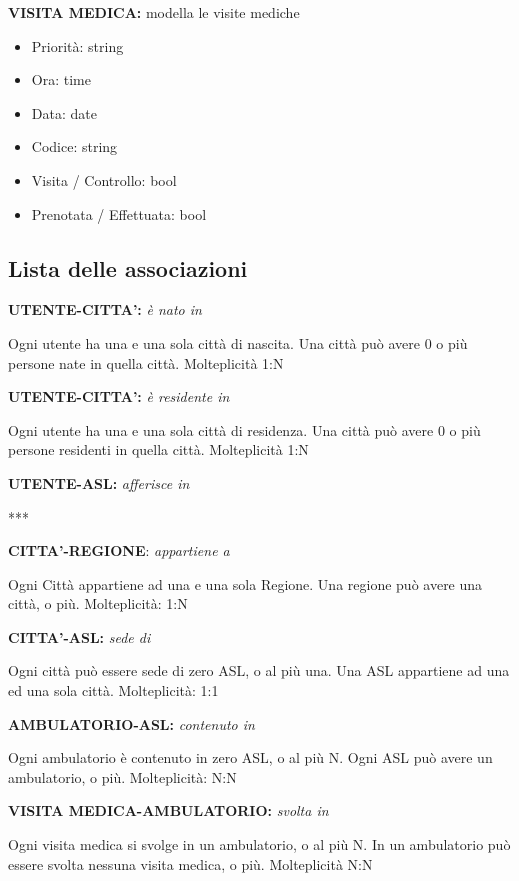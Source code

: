 \documentclass{report}
\begin{document}
\textbf{VISITA MEDICA:} 
modella le visite mediche 
\begin{itemize}
\item Priorità: string
\item Ora: time
\item Data: date
\item Codice: string
\item Visita / Controllo: bool
\item Prenotata / Effettuata: bool
\end{itemize}

\subsection*{Lista delle associazioni}

\begin{center}
\textbf{UTENTE-CITTA’:}\textit{ è nato in}
\end{center}
Ogni utente ha una e una sola città di nascita. Una città può avere 0 o più persone nate in quella città.
Molteplicità 1:N
\begin{center}

\textbf{UTENTE-CITTA’:} \textit{è residente in}
\end{center}
Ogni utente ha una e una sola città di residenza. Una città può avere 0 o più persone residenti in quella città.
Molteplicità 1:N
\begin{center}

\textbf{UTENTE-ASL:} \textit{afferisce in}
\end{center}
***

\begin{center}
\textbf{CITTA’-REGIONE}: \textit{appartiene a}
\end{center}
Ogni Città appartiene ad una e una sola Regione. Una regione può avere una città, o più.
Molteplicità: 1:N
\begin{center}

\textbf{CITTA’-ASL:} \textit{sede di}
\end{center}
 Ogni città può essere sede di zero ASL, o al più una. Una ASL appartiene ad una ed una sola città.
Molteplicità: 1:1
\begin{center}

\textbf{AMBULATORIO-ASL:} \textit{contenuto in}
\end{center}
Ogni ambulatorio è contenuto in  zero ASL, o al più N.  Ogni ASL può avere un ambulatorio, o più.
Molteplicità: N:N

\begin{center}
\textbf{VISITA MEDICA-AMBULATORIO:} \textit{svolta in }
\end{center}
Ogni visita medica si svolge in un ambulatorio, o al più N. In un ambulatorio può essere svolta nessuna visita medica, o più.
Molteplicità N:N
\end{document}
